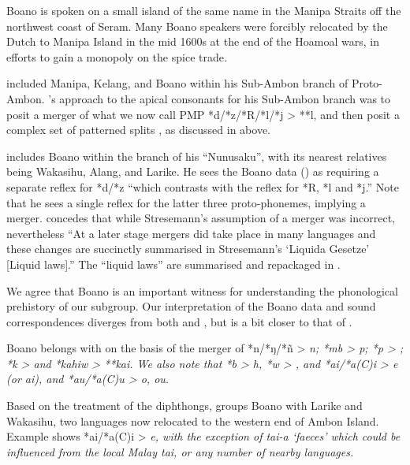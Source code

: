 Boano is spoken on a small island of the same name in the Manipa
Straits off the northwest coast of Seram.
Many Boano speakers were forcibly relocated by the Dutch to Manipa
Island in the mid 1600s at the end of the Hoamoal wars,
in efforts to gain a monopoly on the spice trade.

\citet{Stresemann1927} included Manipa, Kelang,
and Boano within his Sub-Ambon branch of Proto-Ambon.
\citeauthor{Stresemann1927}’s approach to the apical consonants for his Sub-Ambon
branch was to posit a merger of what we now call PMP *d/*z/*R/*l/*j
> **l, and then posit a complex set of patterned splits \citep[23--29]{Stresemann1927},
as discussed in  above.

\citet{Collins1983} includes Boano within the 
branch of his “Nunusaku”,
with its nearest relatives being Wakasihu, Alang, and Larike.
He sees the Boano data (\citeyear[88--93]{Collins1983})
as requiring a separate reflex
for *d/*z “which contrasts with the reflex for *R,
*l and *j.” Note that he sees a single reflex for the latter
three proto-phonemes, implying a merger.
\citet[88]{Collins1983} concedes that while Stresemann’s assumption
of a merger was incorrect,
nevertheless “At a later stage mergers did take place in many
languages and these changes are succinctly summarised
in Stresemann’s ‘Liquida Gesetze’ [Liquid laws].”
The “liquid laws” are summarised
and repackaged in .

We agree that Boano is an important witness for understanding
the phonological prehistory of our  subgroup.
Our interpretation of the Boano data
and sound correspondences diverges from both \citeauthor{Stresemann1927}
and \citeauthor{Collins1983}, but is a bit closer to that of \citeauthor{Collins1983}.

Boano belongs with  on the basis of the merger
of *n/*ŋ/*ñ > \it{n}; *mb > \it{p}; *p > {\0}; *k > {\0}
and  *kahiw > **kai.
We also note that *b > \it{h},
*w > {\0}, and *ai/*a(C)i > \it{e} (or \it{ai}),
and *au/*a(C)u > \it{o}, \it{ou}.

Based on the treatment of the diphthongs,
\citet[69--73]{Collins1983} groups Boano with Larike
and Wakasihu, two languages now relocated to the western end of Ambon Island.
Example  shows *ai/*a(C)i > \it{e},
with the exception of \it{tai-a} ‘faeces’ which could be influenced
from the local Malay \it{tai},
or any number of nearby languages.
\\

